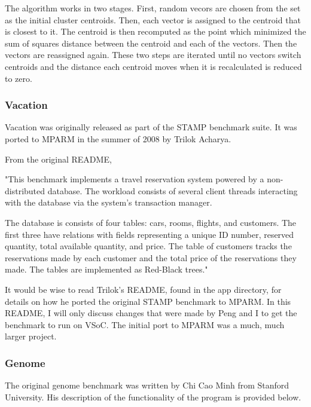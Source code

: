 \documentclass{article}
\begin{document}
The algorithm works in two stages. First, random vecors are chosen from the
set as the initial cluster centroids. Then, each vector is assigned to the 
centroid that is closest to it. The centroid is then recomputed as the point
which minimized the sum of squares distance between the centroid and each of 
the vectors. Then the vectors are reassigned again. These two steps are
iterated until no vectors switch centroids and the distance each centroid moves
when it is recalculated is reduced to zero. 

\subsubsection{Vacation}

Vacation was originally released as part of the STAMP benchmark suite. It was
ported to MPARM in the summer of 2008 by Trilok Acharya.

From the original README, 

	"This benchmark implements a travel reservation system powered by a
	non-distributed database. The workload consists of several client threads
	interacting with the database via the system's transaction manager.

	The database is consists of four tables: cars, rooms, flights, and 
	customers. The first three have relations with fields representing a 
	unique ID number, reserved quantity, total available quantity, and price. 
	The table of customers tracks the reservations made by each customer and 
	the total price of the reservations they made. The tables are implemented 
	as Red-Black trees."

It would be wise to read Trilok's README, found in the app directory, for 
details on how he ported the original STAMP benchmark to MPARM. In this README,
I will only discuss changes that were made by Peng and I to get the benchmark
to run on VSoC. The initial port to MPARM was a much, much larger project. 

\subsubsection{Genome}

The original genome benchmark was written by Chi Cao Minh from Stanford 
University. His description of the functionality of the program is provided 
below.
\end{document}
